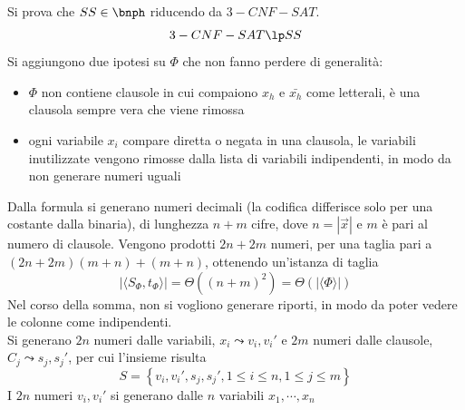 Si prova che $SS \in \bnph$ riducendo da $3-CNF-SAT$.
\begin{equation*}
    3-CNF-SAT \lp SS
\end{equation*}
Si aggiungono due ipotesi su $\Phi$ che non fanno perdere di generalità:
\begin{itemize}[noitemsep,parsep=0pt,partopsep=0pt,topsep=0pt]
    \item $\Phi$ non contiene clausole in cui compaiono $x_h$ e $\bar{x_h}$ come letterali, è una clausola sempre vera che viene rimossa
    \item ogni variabile $x_i$ compare diretta o negata in una clausola, le variabili inutilizzate vengono rimosse dalla lista di variabili indipendenti, in modo da non generare numeri uguali
\end{itemize}
Dalla formula si generano numeri decimali (la codifica differisce solo per una costante dalla binaria), di lunghezza $n+m$ cifre, dove $n = | \vec{x} |$ e $m$ è pari al numero di clausole. Vengono prodotti $2n+2m$ numeri, per una taglia pari a $(2n+2m)(m+n)+(m+n)$, ottenendo un'istanza di taglia
\begin{equation*}
    | \langle S_{\Phi}, t_{\Phi} \rangle | = \Theta \left( \left( n+m \right)^2 \right) =
    \Theta \left( | \langle \Phi \rangle | \right)
\end{equation*}
Nel corso della somma, non si vogliono generare riporti, in modo da poter vedere le colonne come indipendenti.
\\
Si generano $2n$ numeri dalle variabili, $x_i \leadsto v_i, v_i'$
e $2m$ numeri dalle clausole, $C_j \leadsto s_j, s_j'$, per cui l'insieme risulta
\begin{equation*}
    S = \left\{ v_i, v_i', s_j, s_j', 1 \le i \le n, 1 \le j \le m \right\}
\end{equation*}
I $2n$ numeri $v_i, v_i'$ si generano dalle $n$ variabili $x_1, \cdots, x_n$
